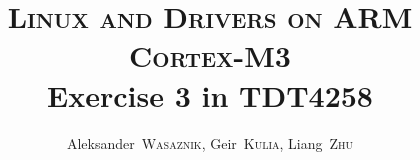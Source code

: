 \documentclass[a4,journal,twoside]{IEEEtran}
\title{
    \textsc{Linux and Drivers on ARM Cortex-M3}\\
    Exercise 3 in TDT4258
}
\author{
    Aleksander~\textsc{Wasaznik},
    Geir~\textsc{Kulia},
    Liang~\textsc{Zhu}
}
\begin{document}
\maketitle

\begin{abstract}

\end{abstract}


\end{document}
